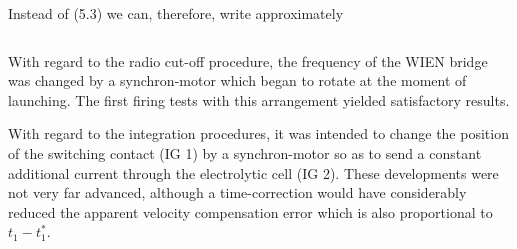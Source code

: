 \documentclass[12pt, a4paper]{article}
\begin{document}
Instead of (5.3) we can, therefore, write approximately

\begin{equation}
\end{equation}

With regard to the radio cut-off procedure, the frequency of the WIEN bridge was changed by a synchron-motor which began to rotate at the moment of launching. The first firing tests with this arrangement yielded satisfactory results.

With regard to the integration procedures, it was intended to change the position of the switching contact (IG 1) by a synchron-motor so as to send a constant additional current through the electrolytic cell (IG 2). These developments were not very far advanced, although a time-correction would have considerably reduced the apparent velocity compensation error which is also proportional to $t_{1}-t_{1}^{*}$.
\end{document}
